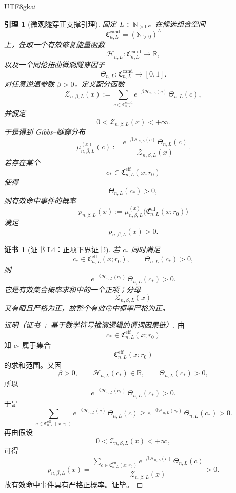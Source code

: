 \documentclass[12pt]{article}
\newtheorem{lemma}{引理}[section]
\newtheorem{Certificate}{证书}[section]
\newcommand{\NN}{\mathbb{N}}
\newcommand{\RR}{\mathbb{R}}
\begin{document}
\begin{CJK*}{UTF8}{gkai}
\begin{lemma}[微观隧穿正支撑引理]
\label{lem:tex36-tunneling-positive}
固定 $L\in\NN_{>0}$。在候选组合空间
\[
  \mathfrak C_{n,L}^{\mathrm{cand}}=(\NN_{>0})^L
\]
上，任取一个有效修复能量函数
\[
  \mathcal H_{n,L}:\mathfrak C_{n,L}^{\mathrm{cand}}\to \RR,
\]
以及一个同伦扭曲微观隧穿因子
\[
  \Theta_{n,L}:\mathfrak C_{n,L}^{\mathrm{cand}}\to [0,1].
\]
对任意逆温参数 $\beta>0$，定义配分函数
\[
  \mathcal Z_{n,\beta,L}(x)
  :=
  \sum_{c\in \mathfrak C_{n,L}^{\mathrm{cand}}}
  e^{-\beta \mathcal H_{n,L}(c)}\,\Theta_{n,L}(c),
\]
并假定
\[
  0<\mathcal Z_{n,\beta,L}(x)<+\infty.
\]
于是得到 Gibbs--隧穿分布
\[
  \mu_{n,\beta,L}^{(x)}(c)
  :=
  \frac{
    e^{-\beta \mathcal H_{n,L}(c)}\,\Theta_{n,L}(c)
  }{
    \mathcal Z_{n,\beta,L}(x)
  }.
\]
若存在某个
\[
  c_\ast\in \mathfrak C_{n,L}^{\mathrm{eff}}(x;r_0)
\]
使得
\[
  \Theta_{n,L}(c_\ast)>0,
\]
则有效命中事件的概率
\[
  p_{n,\beta,L}(x)
  :=
  \mu_{n,\beta,L}^{(x)}\bigl(
    \mathfrak C_{n,L}^{\mathrm{eff}}(x;r_0)
  \bigr)
\]
满足
\[
  p_{n,\beta,L}(x)>0.
\]
\end{lemma}

\begin{Certificate}[证书 L4：正项下界证书]
\label{cert:tex36-l4}
若 $c_\ast$ 同时满足
\[
  c_\ast\in \mathfrak C_{n,L}^{\mathrm{eff}}(x;r_0),
  \qquad
  \Theta_{n,L}(c_\ast)>0,
\]
则
\[
  e^{-\beta \mathcal H_{n,L}(c_\ast)}\,\Theta_{n,L}(c_\ast)>0.
\]
它是有效集合概率求和中的一个正项；分母
\[
  \mathcal Z_{n,\beta,L}(x)
\]
又有限且严格为正，故整个有效命中概率严格为正。
\end{Certificate}

\begin{proof}[证明（证书 + 基于数学符号推演逻辑的谓词因果链）]
由
\[
  c_\ast\in \mathfrak C_{n,L}^{\mathrm{eff}}(x;r_0)
\]
知 $c_\ast$ 属于集合
\[
  \mathfrak C_{n,L}^{\mathrm{eff}}(x;r_0)
\]
的求和范围。又因
\[
  \beta>0,\qquad
  \mathcal H_{n,L}(c_\ast)\in\RR,\qquad
  \Theta_{n,L}(c_\ast)>0,
\]
所以
\[
  e^{-\beta \mathcal H_{n,L}(c_\ast)}\,\Theta_{n,L}(c_\ast)>0.
\]
于是
\[
  \sum_{c\in \mathfrak C_{n,L}^{\mathrm{eff}}(x;r_0)}
  e^{-\beta \mathcal H_{n,L}(c)}\,\Theta_{n,L}(c)
  \ge
  e^{-\beta \mathcal H_{n,L}(c_\ast)}\,\Theta_{n,L}(c_\ast)
  >0.
\]
再由假设
\[
  0<\mathcal Z_{n,\beta,L}(x)<+\infty,
\]
可得
\[
  p_{n,\beta,L}(x)
  =
  \frac{
    \sum_{c\in \mathfrak C_{n,L}^{\mathrm{eff}}(x;r_0)}
    e^{-\beta \mathcal H_{n,L}(c)}\,\Theta_{n,L}(c)
  }{
    \mathcal Z_{n,\beta,L}(x)
  }
  >0.
\]
故有效命中事件具有严格正概率。证毕。
\end{proof}


\end{CJK*}
\end{document}

